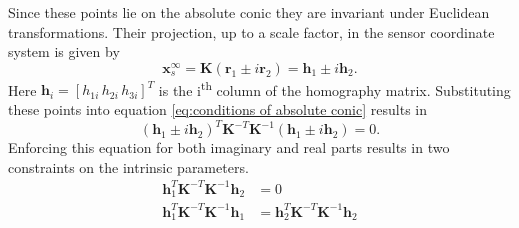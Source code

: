 \documentclass[12pt,oneside,openany,a4paper, %
english, %
masters-t, goldenblock]{usthesis}
\begin{document}
Since these points lie on the absolute conic they are invariant under Euclidean transformations. Their projection, up to a scale factor, in the sensor coordinate system is given by 
\begin{equation}
  \bm{x}_s^{\infty} = \bm{K} \left( \bm{r}_1 \pm i \bm{r}_2 \right) = \bm{h}_1 \pm i \bm{h}_2.
\end{equation}
Here $\bm{h}_i = [h_{1i} \, h_{2i} \, h_{3i}]^T$ is the i\textsuperscript{th} column of the homography matrix. Substituting these points into equation \ref{eq:conditions of absolute conic} results in
\begin{equation}
  \left( \bm{h}_1 \pm i \bm{h}_2 \right)^T \bm{K}^{-T} \bm{K}^{-1} \left( \bm{h}_1 \pm i \bm{h}_2 \right) = 0.
\end{equation}
Enforcing this equation for both imaginary and real parts results in two constraints on the intrinsic parameters.
\begin{align}
  \label{eq:intrinsic constraints 1}
  \bm{h}_1^T \bm{K}^{-T} \bm{K}^{-1} \bm{h}_2 &= 0 \\
  \label{eq:intrinsic constraints 2}
  \bm{h}_1^T \bm{K}^{-T} \bm{K}^{-1} \bm{h}_1 &= \bm{h}_2^T \bm{K}^{-T} \bm{K}^{-1} \bm{h}_2
\end{align}
\end{document}

